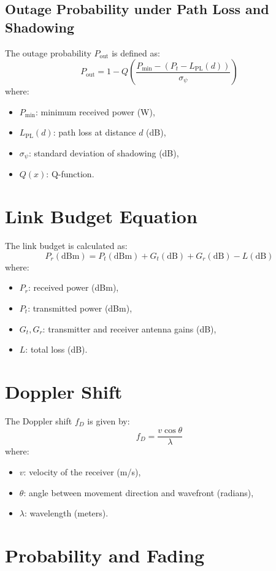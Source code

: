 \documentclass[a4paper,12pt]{book}
\begin{document}
	\subsection{Outage Probability under Path Loss and Shadowing}
	The outage probability \( P_{\text{out}} \) is defined as:
	\[
	P_{\text{out}} = 1 - Q \left( \frac{P_{\min} - (P_t - L_{\text{PL}}(d))}{\sigma_{\psi}} \right)
	\]
	where:
	\begin{itemize}
		\item \( P_{\min} \): minimum received power (W),
		\item \( L_{\text{PL}}(d) \): path loss at distance \( d \) (dB),
		\item \( \sigma_{\psi} \): standard deviation of shadowing (dB),
		\item \( Q(x) \): Q-function.
	\end{itemize}
	
	\section{Link Budget Equation}
	
	The link budget is calculated as:
	\[
	P_r (\text{dBm}) = P_t (\text{dBm}) + G_t (\text{dB}) + G_r (\text{dB}) - L (\text{dB})
	\]
	where:
	\begin{itemize}
		\item \( P_r \): received power (dBm),
		\item \( P_t \): transmitted power (dBm),
		\item \( G_t, G_r \): transmitter and receiver antenna gains (dB),
		\item \( L \): total loss (dB).
	\end{itemize}
	
	\section{Doppler Shift}
	
	The Doppler shift \( f_D \) is given by:
	\[
	f_D = \frac{v \cos \theta}{\lambda}
	\]
	where:
	\begin{itemize}
		\item \( v \): velocity of the receiver (m/s),
		\item \( \theta \): angle between movement direction and wavefront (radians),
		\item \( \lambda \): wavelength (meters).
	\end{itemize}
	
	\section{Probability and Fading}
	
\end{document}
